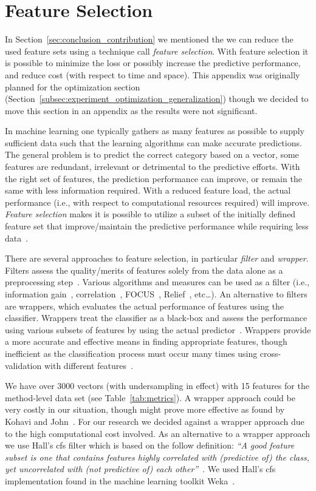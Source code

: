 \chapter{Feature Selection}
\label{app:feature_selection}
In Section~\ref{sec:conclusion_contribution} we mentioned the we can reduce the used feature sets using a technique call \emph{feature selection}. With feature selection it is possible to minimize the loss or possibly increase the predictive performance, and reduce cost (with respect to time and space). This appendix was originally planned for the optimization section (Section~\ref{subsec:experiment_optimization_generalization}) though we decided to move this section in an appendix as the results were not significant.

In machine learning one typically gathers as many features as possible to supply sufficient data such that the learning algorithms can make accurate predictions. The general problem is to predict the correct category based on a vector, some features are redundant, irrelevant or detrimental to the predictive efforts. With the right set of features, the prediction performance can improve, or remain the same with less information required. With a reduced feature load, the actual performance (i.e., with respect to computational resources required) will improve. \emph{Feature selection} makes it is possible to utilize a subset of the initially defined feature set that improve/maintain the predictive performance while requiring less data~\cite{GE03,BL97}.

There are several approaches to feature selection, in particular \emph{filter} and \emph{wrapper}. Filters assess the quality/merits of features solely from the data alone as a preprocessing step~\cite{JKP94,BL97}. Various algorithms and measures can be used as a filter (i.e., information gain~\cite{GE03}, correlation~\cite{Hal99}, FOCUS~\cite{AD91}, Relief~\cite{KR92}, etc\ldots). An alternative to filters are wrappers, which evaluates the actual performance of features using the classifier. Wrappers treat the classifier as a black-box and assess the performance using various subsets of features by using the actual predictor~\cite{JKP94,BL97}. Wrappers provide a more accurate and effective means in finding appropriate features, though inefficient as the classification process must occur many times using cross-validation with different features~\cite{KJ97}.

We have over 3000 vectors (with undersampling in effect) with 15 features for the method-level data set (see Table~\ref{tab:metrics}). A wrapper approach could be very costly in our situation, though might prove more effective as found by Kohavi and John~\cite{KJ97}. For our research we decided against a wrapper approach due to the high computational cost involved. As an alternative to a wrapper approach we use Hall's \gls{cfs} filter which is based on the follow definition: \emph{``A good feature subset is one that contains features highly correlated with (predictive of) the class, yet uncorrelated with (not predictive of) each other''}~\cite{Hal99}. We used Hall's \gls{cfs} implementation found in the machine learning toolkit Weka~\cite{HFH+09}.

